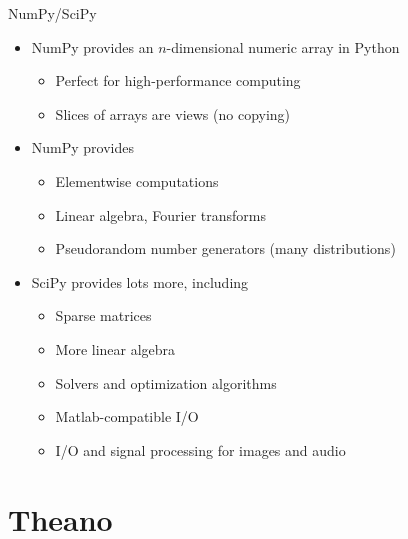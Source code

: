 \documentclass[utf8x,xcolor=pdftex,dvipsnames,table]{beamer}
\begin{document}
\begin{frame}{NumPy/SciPy}
  \begin{itemize}

  \item NumPy provides an $n$-dimensional numeric array in Python
      \begin{itemize}
      \item Perfect for high-performance computing
      \item Slices of arrays are views (no copying)
      \end{itemize}

  \item NumPy provides
      \begin{itemize}
      \item Elementwise computations
      \item Linear algebra, Fourier transforms
      \item Pseudorandom number generators (many distributions)
      \end{itemize}

  \item SciPy provides lots more, including
      \begin{itemize}
      \item Sparse matrices
      \item More linear algebra
      \item Solvers and optimization algorithms
      \item Matlab-compatible I/O
      \item I/O and signal processing for images and audio
      \end{itemize}
  \end{itemize}
\end{frame}

\section{Theano}
\begin{frame}
  \tableofcontents[currentsection]
\end{frame}
\end{document}

